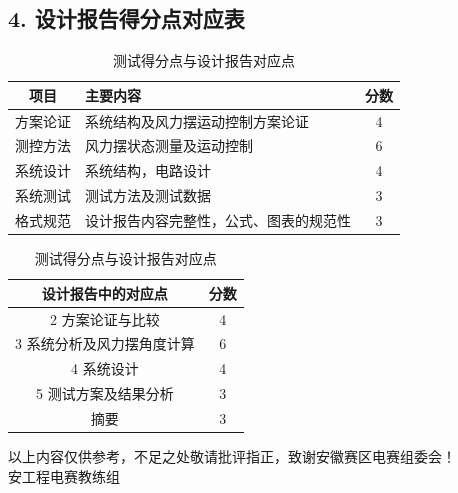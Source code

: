 \documentclass[zihao=-4,fontset=none]{ctexart}
\begin{document}
\subsection*{4. 设计报告得分点对应表}

\begin{table}[H]
    \centering
    \caption{测试得分点与设计报告对应点}
    \label{tab:score}
    \begin{tabular}{cp{4cm}c}
        \toprule
        项目 & 主要内容 & 分数 \\
        \midrule
        方案论证 & 系统结构及风力摆运动控制方案论证 & 4 \\
        测控方法 & 风力摆状态测量及运动控制 & 6 \\
        系统设计 & 系统结构，电路设计 & 4 \\
        系统测试 & 测试方法及测试数据 & 3 \\
        格式规范 & 设计报告内容完整性，公式、图表的规范性 & 3 \\
        \bottomrule
    \end{tabular}
    \begin{center}
        \vspace{0.3cm}
        \begin{tabular}{cc}
            \toprule
            设计报告中的对应点 & 分数 \\
            \midrule
            2 方案论证与比较 & 4 \\
            3 系统分析及风力摆角度计算 & 6 \\
            4 系统设计 & 4 \\
            5 测试方案及结果分析 & 3 \\
            摘要 & 3 \\
            \bottomrule
        \end{tabular}
    \end{center}
\end{table}

\vspace{1cm}
\begin{center}
    以上内容仅供参考，不足之处敬请批评指正，致谢安徽赛区电赛组委会！ \\[0.5cm]
    安工程电赛教练组 
\end{center}
\end{document}
